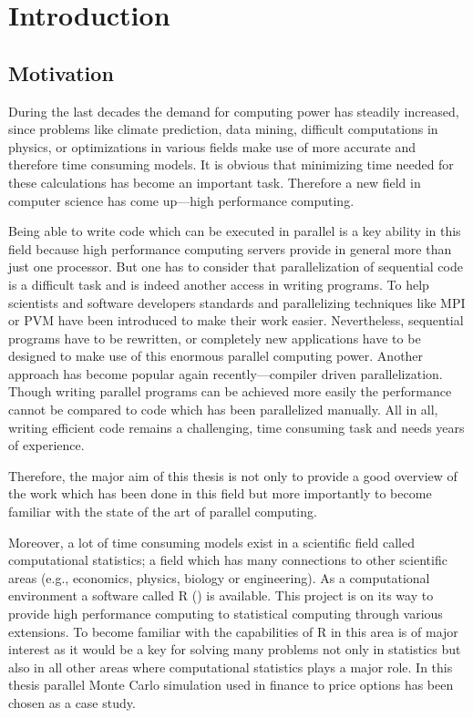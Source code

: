 \chapter{Introduction}
\section{Motivation}
During the last decades the demand for computing power has steadily
increased, since problems like climate prediction, data mining, difficult
computations in physics, or optimizations in various fields
make use of more accurate and therefore time consuming models. It is
obvious that minimizing time needed for these calculations has become
an important task. Therefore a new field in computer science has come
up---high performance computing.

Being able to write code which can be executed in parallel is a key
ability in this field because high performance computing servers
provide in general more than just one processor. But one has to
consider that
parallelization of sequential code is a difficult task and is indeed
another access in writing programs. To help scientists and software
developers standards and parallelizing techniques like MPI or PVM have
been introduced 
to make their work easier. Nevertheless, sequential programs have to
be rewritten, or completely new applications have to be designed to
make use of this enormous parallel computing power. Another approach
has become popular again recently---compiler driven
parallelization. Though writing parallel programs can be achieved
more easily the performance cannot be compared to code which has been
parallelized manually. All in all,
writing efficient code remains a challenging, time consuming task and
needs years of experience. 

Therefore, the major aim of this thesis is not only to 
provide a good overview of the work which has been done in this field
but more importantly to become familiar with the state of the art of
parallel computing.

Moreover, a lot of  time consuming models exist in a scientific field
called computational statistics; a field which has many connections to other
scientific areas (e.g., economics, physics, biology or
engineering). As a computational environment a software called
R (\cite{Rcore07R}) is available. This project is on its way to provide 
high performance computing to statistical computing  through various
extensions. To become familiar with the capabilities of R in
this area is of major interest as it would be a key for solving many
problems not only in statistics but also in all other areas where
computational statistics plays a major role. In this thesis parallel
Monte Carlo simulation used in finance to price options has been
chosen as a case study.

